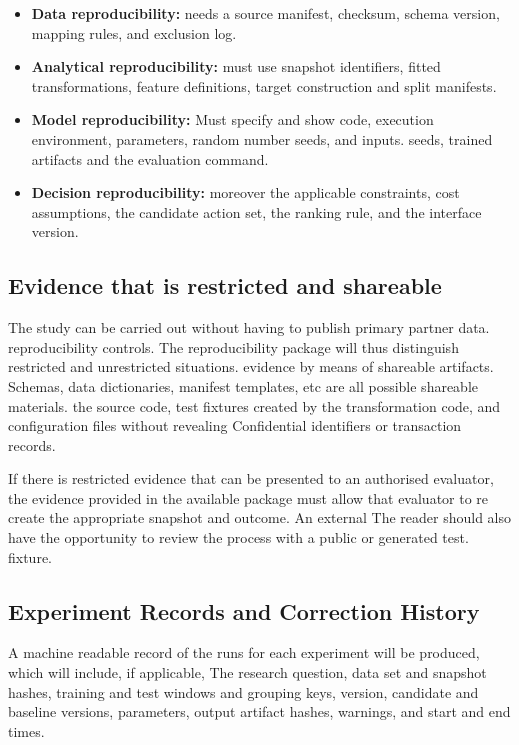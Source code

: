 \documentclass[a4paper,11pt,oneside]{book}
\theoremstyle{plain}
\theoremstyle{definition}
\theoremstyle{remark}
\begin{document}
\begin{itemize}
    \item \textbf{Data reproducibility:} needs a source manifest, checksum, schema version, mapping rules, and exclusion log.
    \item \textbf{Analytical reproducibility:} must use snapshot identifiers, fitted transformations, feature definitions, target construction and split manifests.
    \item \textbf{Model reproducibility:} Must specify and show code, execution environment, parameters, random number seeds, and inputs. seeds, trained artifacts and the evaluation command.
    \item \textbf{Decision reproducibility:} moreover the applicable constraints, cost assumptions, the candidate action set, the ranking rule, and the interface version.
\end{itemize}

\subsection{Evidence that is restricted and shareable}
\label{subsec:restricted_shareable_evidence}

The study can be carried out without having to publish primary partner data. reproducibility controls. The reproducibility package will thus distinguish restricted and unrestricted situations. evidence by means of shareable artifacts. Schemas, data dictionaries, manifest templates, etc are all possible shareable materials. the source code, test fixtures created by the transformation code, and configuration files without revealing Confidential identifiers or transaction records.

If there is restricted evidence that can be presented to an authorised evaluator, the evidence provided in the available package must allow that evaluator to re create the appropriate snapshot and outcome. An external The reader should also have the opportunity to review the process with a public or generated test. fixture.

\subsection{Experiment Records and Correction History}
\label{subsec:experiment_records}

A machine readable record of the runs for each experiment will be produced, which will include, if applicable, The research question, data set and snapshot hashes, training and test windows and grouping keys, version, candidate and baseline versions, parameters, output artifact hashes, warnings, and start and end times.
\end{document}
